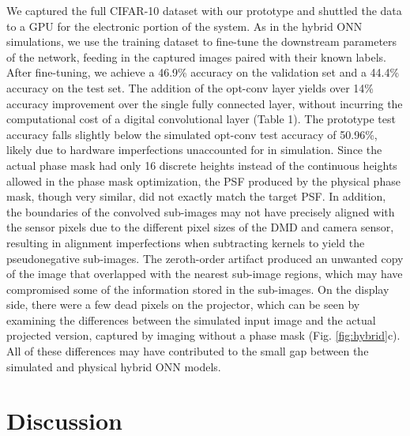 \documentclass[fleqn,10pt]{wlscirep}
\begin{document}
We captured the full CIFAR-10 dataset with our prototype and shuttled the data to a GPU for the electronic portion of the system. As in the hybrid ONN simulations, we use the training dataset to fine-tune the downstream parameters of the network, feeding in the captured images paired with their known labels. After fine-tuning, we achieve a 46.9\%  accuracy on the validation set and a 44.4\% accuracy on the test set. The addition of the opt-conv layer yields over 14\% accuracy improvement over the single fully connected layer, without incurring the computational cost of a digital convolutional layer (Table 1).  The prototype test accuracy falls slightly below the simulated opt-conv test accuracy of 50.96\%, likely due to hardware imperfections unaccounted for in simulation. Since the actual phase mask had only 16 discrete heights instead of the continuous heights allowed in the phase mask optimization, the PSF produced by the physical phase mask, though very similar, did not exactly match the target PSF. In addition, the boundaries of the convolved sub-images may not have precisely aligned with the sensor pixels due to the different pixel sizes of the DMD and camera sensor, resulting in alignment imperfections when subtracting kernels to yield the pseudonegative sub-images. The zeroth-order artifact produced an unwanted copy of the image that overlapped with the nearest sub-image regions, which may have compromised some of the information stored in the sub-images. On the display side, there were a few dead pixels on the projector, which can be seen by examining the differences between the simulated input image and the actual projected version, captured by imaging without a phase mask (Fig. \ref{fig:hybrid}c). All of these differences may have contributed to the small gap between the simulated and physical hybrid ONN models.


\section*{Discussion}
\label{sec:discussion}
\end{document}

